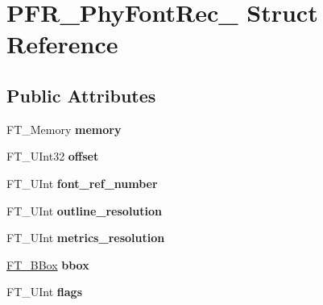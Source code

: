 \hypertarget{struct_p_f_r___phy_font_rec__}{}\section{P\+F\+R\+\_\+\+Phy\+Font\+Rec\+\_\+ Struct Reference}
\label{struct_p_f_r___phy_font_rec__}
\subsection*{Public Attributes}
\begin{DoxyCompactItemize}
\item 
\mbox{\label{struct_p_f_r___phy_font_rec___a7cdfd1e748add127a842f5ce4aaa1e87}} 
F\+T\+\_\+\+Memory {\bfseries memory}
\item 
\mbox{\label{struct_p_f_r___phy_font_rec___a039bfe20aac94a3b543a3a5e729cc514}} 
F\+T\+\_\+\+U\+Int32 {\bfseries offset}
\item 
\mbox{\label{struct_p_f_r___phy_font_rec___acae080e46cefe0a944a22934d74463be}} 
F\+T\+\_\+\+U\+Int {\bfseries font\+\_\+ref\+\_\+number}
\item 
\mbox{\label{struct_p_f_r___phy_font_rec___a0cec8ec87a0e441c9d9ff0af6e821945}} 
F\+T\+\_\+\+U\+Int {\bfseries outline\+\_\+resolution}
\item 
\mbox{\label{struct_p_f_r___phy_font_rec___a80aa46f6ce599f9ae1ba10c453794221}} 
F\+T\+\_\+\+U\+Int {\bfseries metrics\+\_\+resolution}
\item 
\mbox{\label{struct_p_f_r___phy_font_rec___a33e29eaf5b8b30005b9ac4b71d400414}} 
\hyperlink{struct_f_t___b_box__}{F\+T\+\_\+\+B\+Box} {\bfseries bbox}
\item 
\mbox{\label{struct_p_f_r___phy_font_rec___a20a0d280c7fa821813ee8f48a2aca38c}} 
F\+T\+\_\+\+U\+Int {\bfseries flags}
\item 
\mbox{\label{struct_p_f_r___phy_font_rec___ac07cc142af0d7cb93d02b2d327850c9c}} 

\end{DoxyCompactItemize}
